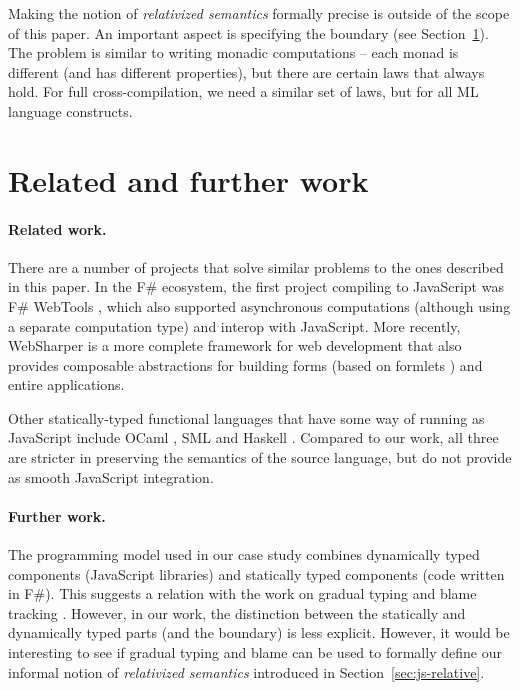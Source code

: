 \documentclass[submission,copyright,creativecommons]{eptcs}
\begin{document}
\noindent
Making the notion of \emph{relativized semantics} formally precise is outside of the scope
of this paper. An important aspect is specifying the boundary (see Section~\ref{sec:conc-interop}).
The problem is similar to writing monadic computations -- each monad is different (and has
different properties), but there are certain laws that always hold. For full cross-compilation,
we need a similar set of laws, but for all ML language constructs.


\section{Related and further work}
\label{sec:conc-interop}

\paragraph{Related work.}

There are a number of projects that solve similar problems to the ones described in this paper.
In the F\# ecosystem, the first project compiling to JavaScript was F\# WebTools \cite{fsharp-webtools},
which also supported asynchronous computations (although using a separate computation type)
and interop with JavaScript. More recently, WebSharper \cite{websharper-piglets,websharper-guis}
is a more complete framework for web development that also provides composable abstractions for
building forms (based on formlets \cite{links-formlets}) and entire applications.

Other statically-typed functional languages that have some way of running as JavaScript
include OCaml \cite{js_ocmal}, SML \cite{js_sml} and Haskell \cite{haskell-ghcjs}. Compared to
our work, all three are stricter in preserving the semantics of the source language, but
do not provide as smooth JavaScript integration.

\vspace{-1em}
\paragraph{Further work.}
The programming model used in our case study combines dynamically typed components (JavaScript
libraries) and statically typed components (code written in F\#). This suggests a relation with
the work on gradual typing \cite{gradual-typing} and blame tracking \cite{blame-well}. However,
in our work, the distinction between the statically and dynamically typed parts (and the boundary)
is less explicit. However, it would be interesting to see if gradual typing and blame can be
used to formally define our informal notion of \emph{relativized semantics} introduced in
Section~\ref{sec:js-relative}.
\end{document}
